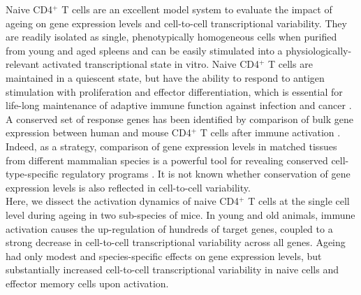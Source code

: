Naive CD4$^+$ T cells are an excellent model system to evaluate the impact of ageing on gene expression levels and cell-to-cell transcriptional variability. They are readily isolated as single, phenotypically homogeneous cells when purified from young and aged spleens and can be easily stimulated into a physiologically-relevant activated transcriptional state in vitro. Naive CD4$^+$ T cells are maintained in a quiescent state, but have the ability to respond to antigen stimulation with proliferation and effector differentiation, which is essential for life-long maintenance of adaptive immune function against infection and cancer \citep{Swain2012, Kim2014a}. \\

A conserved set of response genes has been identified by comparison of bulk gene expression between human and mouse CD4$^+$ T cells after immune activation \citep{Shay2013}. Indeed, as a strategy, comparison of gene expression levels in matched tissues from different mammalian species is a powerful tool for revealing conserved cell-type-specific regulatory programs \citep{Sudmant2015, Finseth2014, Brawand2011, Flajnik2009}. It is not known whether conservation of gene expression levels is also reflected in cell-to-cell variability.\\

Here, we dissect the activation dynamics of naive CD4$^+$ T cells at the single cell level during ageing in two sub-species of mice. In young and old animals, immune activation causes the up-regulation of hundreds of target genes, coupled to a strong decrease in cell-to-cell transcriptional variability across all genes. Ageing had only modest and species-specific effects on gene expression levels, but substantially increased cell-to-cell transcriptional variability in naive cells and effector memory cells upon activation.

